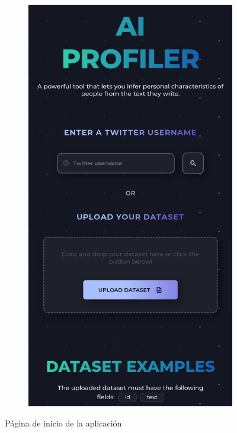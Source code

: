 \begin{figure}[H]
\begin{subfigure}[c]{0.21\textwidth}
			\includegraphics[width=\textwidth]{imagenes/home_movil.png}
			\label{fig:casouso_home_movil}
	\end{subfigure}
	\vspace{-1\baselineskip}
	\caption{Página de inicio de la aplicación}
	\label{fig:casouso_home}
\end{figure}

